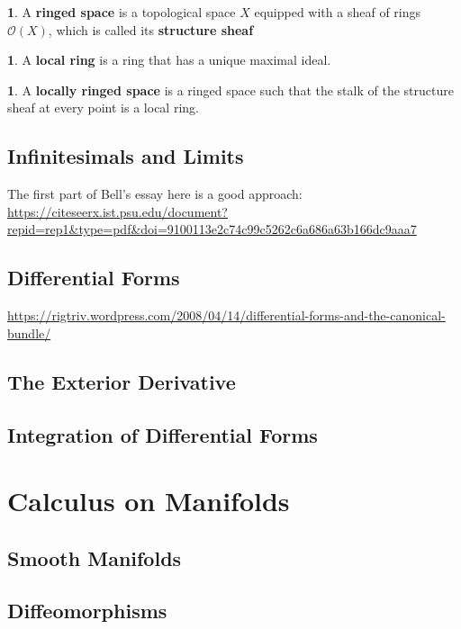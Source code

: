 \documentclass[oneside,english]{amsbook}
\numberwithin{section}{chapter}
\theoremstyle{plain}
\theoremstyle{definition}
\newtheorem{defn}[thm]{\protect\definitionname}
\providecommand{\definitionname}{Definition}
\begin{document}
			\begin{defn} 
				A \textbf{ringed space} is a topological space $X$ equipped with a sheaf of rings $\mathscr{O}(X)$, which is called its \textbf{structure sheaf}
			\end{defn}
			
			\begin{defn} 
				A \textbf{local ring} is a ring that has a unique maximal ideal.
			\end{defn}
			
			\begin{defn} 
				A \textbf{locally ringed space} is a ringed space such that the stalk of the structure sheaf at every point is a local ring.
			\end{defn}

		\section{Infinitesimals and Limits}
		
		The first part of Bell's essay here is a good approach: \url{https://citeseerx.ist.psu.edu/document?repid=rep1&type=pdf&doi=9100113e2c74c99c5262c6a686a63b166dc9aaa7}
		
		\section{Differential Forms}
		
		\url{https://rigtriv.wordpress.com/2008/04/14/differential-forms-and-the-canonical-bundle/}
	
		\section{The Exterior Derivative}
	
		\section{Integration of Differential Forms}


	\chapter{Calculus on Manifolds}
	
		\section{Smooth Manifolds}

		\section{Diffeomorphisms}
\end{document}
